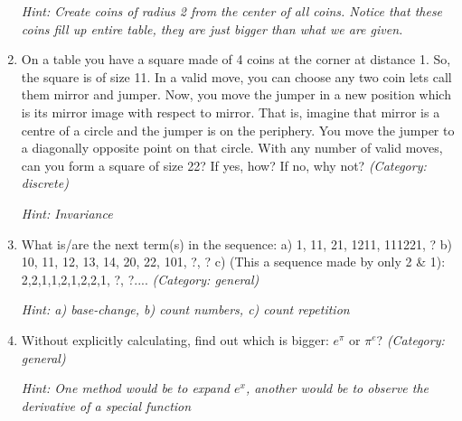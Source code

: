\begin{enumerate}
\small\emph{Hint: Create coins of radius 2 from the center of all coins. Notice that these coins fill up entire table, they are just bigger than what we are given.}





\item On a table you have a square made of 4 coins at the corner at distance 1. So, the square is of size 11.  In a valid move, you can choose any two coin lets call them mirror and jumper. Now, you move the jumper in a new position which is its mirror image with respect to mirror. That is, imagine that mirror is a centre of a circle and the jumper is on the periphery. You move the jumper to a diagonally opposite point on that circle. With any number of valid moves, can you form a square of size 22? If yes, how? If no, why not?
\small\emph{(Category: discrete)}

\small\emph{Hint: Invariance}





\item What is/are the next term(s) in the sequence:
a) 1, 11, 21, 1211, 111221, ?
b) 10, 11, 12, 13, 14, 20, 22, 101, ?, ?
c) (This a sequence made by only 2 \& 1): 2,2,1,1,2,1,2,2,1, ?, ?....
\small\emph{(Category: general)}

\small\emph{Hint: a) base-change, b) count numbers,  c) count repetition}





\item Without explicitly calculating, find out which is bigger: $e^\pi$ or $\pi^e$?
\small\emph{(Category: general)}

\small\emph{Hint: One method would be to expand $e^x$, another would be to observe the derivative of a special function}





\end{enumerate}

